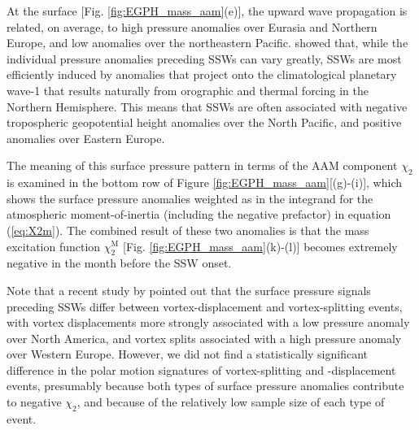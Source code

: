 \documentclass[draft,jgrga]{agutex}
\begin{document}
\begin{article}
 {At the surface} [Fig. \ref{fig:EGPH_mass_aam}(e)],   {the upward wave propagation is related, on average, to high pressure anomalies over Eurasia and Northern Europe, and low anomalies over the northeastern Pacific.}
\cite{Garfinkel2010}  {showed that, while the individual pressure anomalies preceding SSWs can vary greatly, SSWs are most efficiently induced by anomalies that project onto the climatological planetary wave-1 that results naturally from orographic and thermal forcing in the Northern Hemisphere.}
 {This means that SSWs are often associated with negative tropospheric geopotential height anomalies over the North Pacific, and positive anomalies over Eastern Europe.}

 {The meaning of this surface pressure pattern in terms of the AAM component $\chi_2$ is examined in the bottom row of Figure} \ref{fig:EGPH_mass_aam}[(g)-(i)],  {which shows the surface pressure anomalies weighted as in the integrand for the atmospheric moment-of-inertia (including the negative prefactor)} in equation (\ref{eq:X2m}).  
 {The combined result of these two anomalies is that} the  {mass} excitation function $\chi_2^{\text{M}}$ [Fig. \ref{fig:EGPH_mass_aam}(k)-(l)] becomes extremely negative in the month before the SSW onset.

 {Note that a recent study by} \citet{Mitchell2012}  {pointed out that the surface pressure signals preceding SSWs differ between vortex-displacement and vortex-splitting events, with vortex displacements more strongly associated with a low pressure anomaly over North America, and vortex splits associated with a high pressure anomaly over Western Europe.  
However, we did not find a statistically significant difference in the polar motion signatures of vortex-splitting and -displacement events, presumably because both types of surface pressure anomalies contribute to negative $\chi_2$, and because of the relatively low sample size of each type of event.}
  

\end{article}
\end{document}

